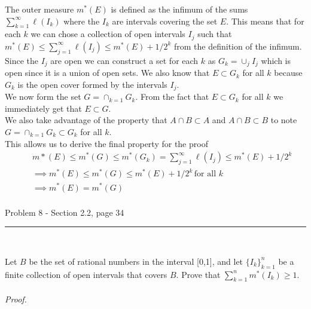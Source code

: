 \documentclass[11pt,reqno]{article}
\begin{document}
The outer measure $m^*(E)$ is defined as the infimum of the sums $\sum_{k = 1}^\infty \ell(I_k)$ where the $I_k$ are intervals covering the set $E$. This means that for each $k$ we can chose a collection of open intervals $I_j$ such that  $m^*(E) \le \sum_{j = 1}^\infty \ell(I_j) \le m^*(E) + 1/2^k$ from the definition of the infimum.\\
\indent Since the $I_j$ are open we can construct a set for each $k$ as $G_k = \cup_j I_j$ which is open since it is a union of open sets. We also know that $E \subset G_k$ for all $k$ because $G_k$ is the open cover formed by the intervals $I_j$. \\
\indent We now form the set $G = \cap_{k=1} G_k$. From the fact that $E \subset G_k$ for all $k$ we immediately get that $E \subset G$.\\
\indent We also take advantage of the property that $A \cap B \subset A$ and $A \cap B \subset B$ to note $G = \cap_{k=1} G_k \subset G_k$ for all $k$. \\
This allows us to derive the final property for the proof
\begin{eqnarray*}
&&m*(E) \le m^*(G) \le m^*(G_k) =  \sum_{j = 1}^\infty \ell(I_j) \le m^*(E) + 1/2^k\\
&& \implies m^*(E) \le m^*(G) \le m^*(E) + 1/2^k \, \text{for all $k$} \\
&& \implies m^*(E) = m^*(G)\\
\end{eqnarray*}


\begin{flushleft} 
Problem 8 - Section 2.2, page 34\\
\rule{500pt}{1pt}\\
\end{flushleft} 

Let $B$ be the set of rational numbers in the interval [0,1], and let $\{ I_k \}^n_{k=1}$ be a finite collection of open intervals that covers $B$. Prove that $\sum^n_{k=1} m^*(I_k) \ge 1$.
\\\\ \emph{Proof.}
\end{document}
